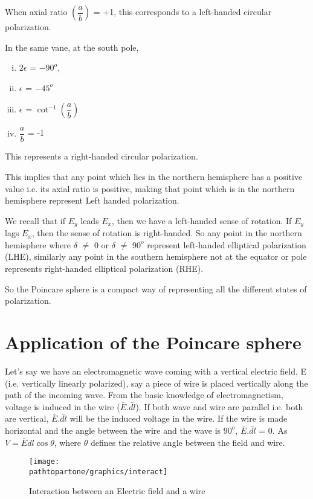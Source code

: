 When axial ratio $(\dfrac{a}{b})$ = +1, this corresponds to a left-handed circular polarization.

In the same vane, at the south pole,
\begin{enumerate}[(i)]
\item	$2\epsilon$ = $-90^{o}$, 
\item $\epsilon$ = $-45^{o}$
\item $\epsilon$ = $\cot^{-1}(\dfrac{a}{b})$
\item $\dfrac{a}{b}$ = -1
\end{enumerate}	
This represents a right-handed circular polarization.

This implies that any point which lies in the northern hemisphere has a positive value i.e. its axial ratio is positive, making that point which is in the northern hemisphere represent Left handed polarization.

We recall that if $E_{y}$ leads $E_{x}$, then we have a left-handed sense of rotation. If $E_{y}$ lags $E_{x}$, then the sense of rotation is right-handed. So any point in the northern hemisphere where $\delta$ $\neq$ 0 or $\delta$ $\neq$ $90^{o}$ represent left-handed elliptical polarization  (LHE), similarly any point in the southern hemisphere not at the equator or pole represents right-handed elliptical polarization (RHE).

So the Poincare sphere is a compact way of representing all the different states of polarization.

\section{Application of the Poincare sphere}
Let's say we have an electromagnetic wave coming with a vertical electric field, E (i.e. vertically linearly polarized), say a piece of wire is placed vertically along the path of the incoming wave. From the basic knowledge of electromagnetism, voltage is induced in the wire ($\bar{E}$.$\bar{dl}$). If both wave and wire are parallel i.e. both are vertical, $\bar{E}$.$\bar{dl}$ will be the induced voltage in the wire. If the wire is made horizontal and the angle between the wire and the wave is $90^{o}$, $\bar{E}$.$\bar{dl}$ = 0. As $ V = \bar{E}dl\cos\theta $, where $ \theta $ defines the relative angle between the field and wire.
\begin{figure}[h]
\centering
\texttt{[image: \\pathtopartone/graphics/interact]}
\caption{Interaction between an Electric field and a wire}
\label{fig:interact}
\end{figure}

